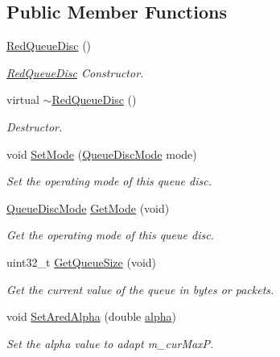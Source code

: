\subsection*{Public Member Functions}
\begin{DoxyCompactItemize}
\item 
\hyperlink{classns3_1_1RedQueueDisc_a0173a0792bb22425223a1d2dba185a6f}{Red\+Queue\+Disc} ()
\begin{DoxyCompactList}\small\item\em \hyperlink{classns3_1_1RedQueueDisc}{Red\+Queue\+Disc} Constructor. \end{DoxyCompactList}\item 
virtual \hyperlink{classns3_1_1RedQueueDisc_a23a655d0ba66587d832899225c8cfcde}{$\sim$\+Red\+Queue\+Disc} ()
\begin{DoxyCompactList}\small\item\em Destructor. \end{DoxyCompactList}\item 
void \hyperlink{classns3_1_1RedQueueDisc_ac87e3eb66b4e47593dde63a4638ad02f}{Set\+Mode} (\hyperlink{classns3_1_1RedQueueDisc_addca87c9127669da12f19adfe7d14a30}{Queue\+Disc\+Mode} mode)
\begin{DoxyCompactList}\small\item\em Set the operating mode of this queue disc. \end{DoxyCompactList}\item 
\hyperlink{classns3_1_1RedQueueDisc_addca87c9127669da12f19adfe7d14a30}{Queue\+Disc\+Mode} \hyperlink{classns3_1_1RedQueueDisc_af1064caa1eee00041ebfb43bc6e25abc}{Get\+Mode} (void)
\begin{DoxyCompactList}\small\item\em Get the operating mode of this queue disc. \end{DoxyCompactList}\item 
uint32\+\_\+t \hyperlink{classns3_1_1RedQueueDisc_aa201a831b85c287a99d7a5e04455b463}{Get\+Queue\+Size} (void)
\begin{DoxyCompactList}\small\item\em Get the current value of the queue in bytes or packets. \end{DoxyCompactList}\item 
void \hyperlink{classns3_1_1RedQueueDisc_a8fb1a23699ad8fcc955b58c5988bc949}{Set\+Ared\+Alpha} (double \hyperlink{lte__uplink__power__control_8m_a62197192f0fbf4e0675eb37be1c4c175}{alpha})
\begin{DoxyCompactList}\small\item\em Set the alpha value to adapt m\+\_\+cur\+MaxP. \end{DoxyCompactList}\item 

\end{DoxyCompactItemize}
